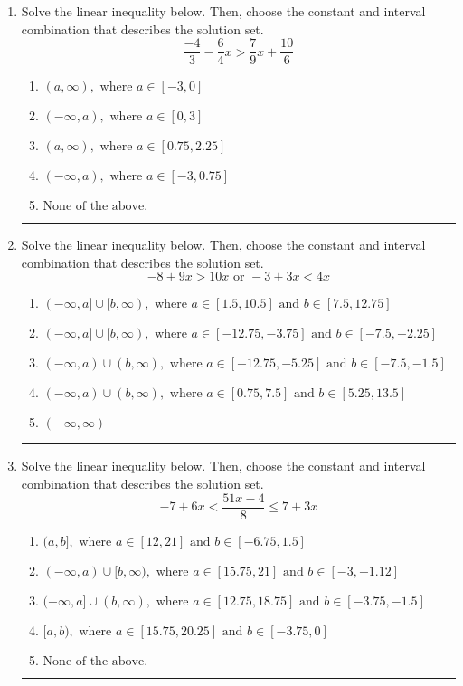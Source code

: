 \documentclass[14pt]{extbook}
\newcommand{\litem}[1]{\item#1\hspace*{-1cm}\rule{\textwidth}{0.4pt}}
\begin{document}
\begin{enumerate}
\litem{
Solve the linear inequality below. Then, choose the constant and interval combination that describes the solution set.\[ \frac{-4}{3} - \frac{6}{4} x > \frac{7}{9} x + \frac{10}{6} \]\begin{enumerate}[label=\Alph*.]
\item \( (a, \infty), \text{ where } a \in [-3, 0] \)
\item \( (-\infty, a), \text{ where } a \in [0, 3] \)
\item \( (a, \infty), \text{ where } a \in [0.75, 2.25] \)
\item \( (-\infty, a), \text{ where } a \in [-3, 0.75] \)
\item \( \text{None of the above}. \)

\end{enumerate} }
\litem{
Solve the linear inequality below. Then, choose the constant and interval combination that describes the solution set.\[ -8 + 9 x > 10 x \text{ or } -3 + 3 x < 4 x \]\begin{enumerate}[label=\Alph*.]
\item \( (-\infty, a] \cup [b, \infty), \text{ where } a \in [1.5, 10.5] \text{ and } b \in [7.5, 12.75] \)
\item \( (-\infty, a] \cup [b, \infty), \text{ where } a \in [-12.75, -3.75] \text{ and } b \in [-7.5, -2.25] \)
\item \( (-\infty, a) \cup (b, \infty), \text{ where } a \in [-12.75, -5.25] \text{ and } b \in [-7.5, -1.5] \)
\item \( (-\infty, a) \cup (b, \infty), \text{ where } a \in [0.75, 7.5] \text{ and } b \in [5.25, 13.5] \)
\item \( (-\infty, \infty) \)

\end{enumerate} }
\litem{
Solve the linear inequality below. Then, choose the constant and interval combination that describes the solution set.\[ -7 + 6 x < \frac{51 x - 4}{8} \leq 7 + 3 x \]\begin{enumerate}[label=\Alph*.]
\item \( (a, b], \text{ where } a \in [12, 21] \text{ and } b \in [-6.75, 1.5] \)
\item \( (-\infty, a) \cup [b, \infty), \text{ where } a \in [15.75, 21] \text{ and } b \in [-3, -1.12] \)
\item \( (-\infty, a] \cup (b, \infty), \text{ where } a \in [12.75, 18.75] \text{ and } b \in [-3.75, -1.5] \)
\item \( [a, b), \text{ where } a \in [15.75, 20.25] \text{ and } b \in [-3.75, 0] \)
\item \( \text{None of the above.} \)


\end{enumerate}}
\end{enumerate}
\end{document}
